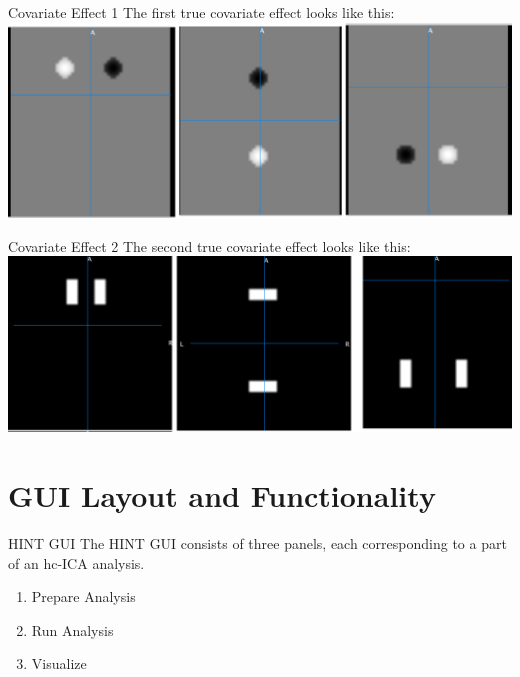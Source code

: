 \documentclass[11pt]{beamer}
\begin{document}
\begin{frame}{Covariate Effect 1}
The first true covariate effect looks like this:
		\includegraphics[width=1\linewidth]{figs/cov1truth}
\end{frame}

\begin{frame}{Covariate Effect 2}
The second true covariate effect looks like this:
		\includegraphics[width=1\linewidth]{figs/cov2truth}
\end{frame}

\section{GUI Layout and Functionality}

\begin{frame}{HINT GUI}
The HINT GUI consists of three panels, each corresponding to a part of an hc-ICA analysis.

\begin{enumerate}
\item Prepare Analysis
\item Run Analysis
\item Visualize
\end{enumerate}
\end{frame}
\end{document}
